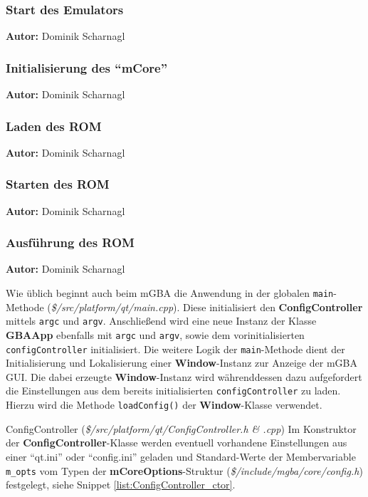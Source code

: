 \documentclass[11pt,a4paper]{scrartcl}
\newcommand{\AutorDominik} {
    \vspace{-4mm}
    \large \textbf{Autor:} Dominik Scharnagl \normalsize
    \vspace{2mm}
}
\begin{document}
\subsubsection{Start des Emulators}
\AutorDominik

\subsubsection{Initialisierung des \enquote{mCore}}
\AutorDominik

\subsubsection{Laden des ROM}
\AutorDominik

\subsubsection{Starten des ROM}
\AutorDominik

\subsubsection{Ausf\"uhrung des ROM}
\AutorDominik











Wie \"ublich beginnt auch beim mGBA die Anwendung in der globalen \verb|main|-Methode (\textit{\$/src/platform/qt/main.cpp}). Diese initialisiert den \textbf{ConfigController} mittels \verb|argc| und \verb|argv|. Anschlie{\ss}end wird eine neue Instanz der Klasse \textbf{GBAApp} ebenfalls mit \verb|argc| und \verb|argv|, sowie dem vorinitialisierten \verb|configController| initialisiert. Die weitere Logik der \verb|main|-Methode dient der Initialisierung und Lokalisierung einer \textbf{Window}-Instanz zur Anzeige der mGBA GUI. Die dabei erzeugte \textbf{Window}-Instanz wird w\"ahrenddessen dazu aufgefordert die Einstellungen aus dem bereits initialisierten \verb|configController| zu laden. Hierzu wird die Methode \verb|loadConfig()| der \textbf{Window}-Klasse verwendet.

\vspace{5mm}
\large ConfigController \normalsize(\textit{\$/src/platform/qt/ConfigController.h \& .cpp})
\vspace{2mm}\newline
Im Konstruktor der \textbf{ConfigController}-Klasse werden eventuell vorhandene Einstellungen aus einer \enquote{qt.ini} oder \enquote{config.ini} geladen und Standard-Werte der Membervariable \verb|m_opts| vom Typen der \textbf{mCoreOptions}-Struktur (\textit{\$/include/mgba/core/config.h}) festgelegt, siehe Snippet \ref{list:ConfigController_ctor}.
\end{document}
